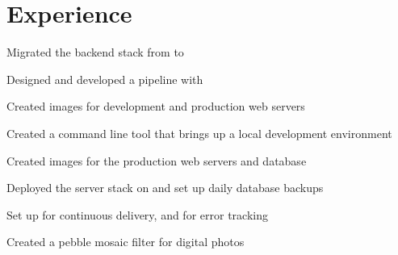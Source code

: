 \documentclass[]{deedy-resume-openfont}
\begin{document}
\begin{minipage}[t]{0.66\textwidth}


\section{Experience}

\begin{tightemize}

\item Migrated the backend stack from to 

\item Designed and developed a  pipeline with 

\item Created images for development and production web servers

\item Created a command line tool that brings up a local development environment

\end{tightemize}
\sectionsep
{}
\begin{tightemize}

\item Created images for the production web servers and database

\item Deployed the server stack on and set up daily database backups

\item Set up for continuous delivery, and for error tracking

\end{tightemize}
\sectionsep
{}
\begin{tightemize}

\item Created a pebble mosaic filter for digital photos


\end{tightemize}
\end{minipage}
\end{document}
